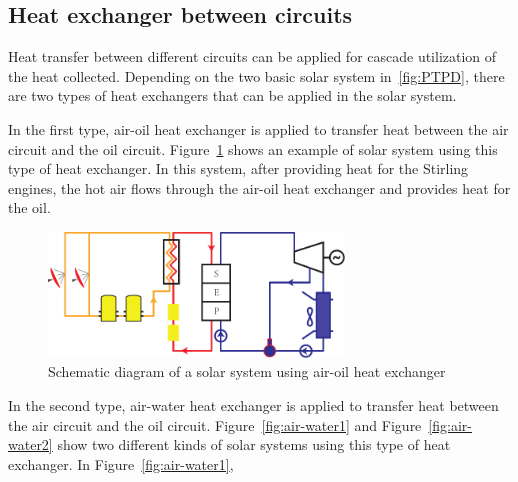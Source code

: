\subsection{Heat exchanger between circuits}
\label{sec:hebc}

Heat transfer between different circuits can be applied for cascade utilization of the heat collected. Depending on the two basic solar system in~\ref{fig:PTPD}, there are two types of heat exchangers that can be applied in the solar system.

In the first type, air-oil heat exchanger is applied to transfer heat between the air circuit and the oil circuit. Figure~\ref{fig:air-oil} shows an example of solar system using this type of heat exchanger. In this system, after providing heat for the Stirling engines, the hot air flows through the air-oil heat exchanger and provides heat for the oil. 

\begin{figure}[h]
\centering 
\includegraphics[width=0.7\textwidth]{fig/air-oil}
\caption{Schematic diagram of a solar system using air-oil heat exchanger}\label{fig:air-oil}
\end{figure}

In the second type, air-water heat exchanger is applied to transfer heat between the air circuit and the oil circuit. Figure~\ref{fig:air-water1} and Figure~\ref{fig:air-water2} show two different kinds of solar systems using this type of heat exchanger. In Figure~\ref{fig:air-water1}, 

